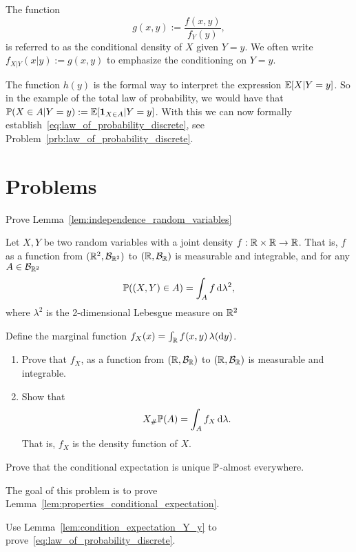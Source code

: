 The function
\begin{equation}
	g(x,y) := \frac{f(x,y)}{f_Y(y)},
\end{equation}
is referred to as the conditional density of $X$ given $Y = y$. We often write $f_{X|Y}(x|y) := g(x,y)$ to emphasize the conditioning on $Y = y$.

The function $h(y)$ is the formal way to interpret the expression $\mathbb E[X | Y=y]$. So in the example of the total law of probability, we would have that $\mathbb P(X\in A | Y = y) := \mathbb E[\mathbf{1}_{X \in A} | Y = y]$. With this we can now formally establish~\eqref{eq:law_of_probability_discrete}, see Problem~\ref{prb:law_of_probability_discrete}.   

\section{Problems}

\begin{problem}\label{prb:independence_random_variables}
Prove Lemma~\ref{lem:independence_random_variables}
\end{problem}

\begin{problem}
Let $X,Y$ be two random variables with a joint density $f : \mathbb R \times \mathbb R \to \mathbb R$. That is, $f$ as a function from $(\mathbb R^2, \mathcal B_{\mathbb R^2})$ to $(\mathbb R, \mathcal B_{\mathbb R})$ is measurable and integrable, and for any $A \in \mathcal B_{\mathbb R^2}$
\[
	\mathbb P((X,Y) \in A) = \int_A f \, \mathrm{d} \lambda^2,
\]
where $\lambda^2$ is the 2-dimensional Lebesgue measure on $\mathbb R^2$

Define the marginal function $f_X(x) = \int_{\mathbb R} f(x,y) \, \lambda(\mathrm{d} y)$.
\begin{enumerate}[label={(\alph*)}]
\item Prove that $f_X$, as a function from $(\mathbb R, \mathcal B_{\mathbb R})$ to $(\mathbb R, \mathcal B_{\mathbb R})$ is measurable and integrable.
\item Show that
\[
	X_\# \mathbb P (A) = \int_A f_X \, \mathrm{d} \lambda.
\]
That is, $f_X$ is the density function of $X$.
\end{enumerate}
\end{problem}

\begin{problem}
Prove that the conditional expectation is unique $\mathbb P$-almost everywhere.
\end{problem}

\begin{problem}\label{prb:properties_conditional_expectation}
The goal of this problem is to prove Lemma~\ref{lem:properties_conditional_expectation}.
\end{problem}

\begin{problem}\label{prb:law_of_probability_discrete}
Use Lemma~\ref{lem:condition_expectation_Y_y} to prove~\eqref{eq:law_of_probability_discrete}.
\end{problem}